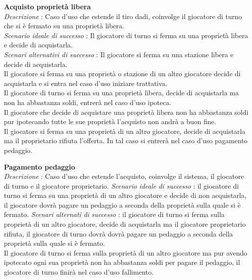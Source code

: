 \documentclass[a4paper]{article}
\begin{document}
\textbf{Acquisto proprietà libera}\\
\textit{Descrizione} : Caso d'uso che estende il tiro dadi, coinvolge il giocatore di turno che si è fermato su una proprietà libera.\\
\textit{Scenario ideale di successo} : Il giocatore di turno si ferma su una proprietà libera e decide di acquistarla.\\
\textit{Scenari alternativi di successo} : Il giocatore si ferma su una stazione libera e decide di acquistarla.\\
Il giocatore si ferma su una proprietà o stazione di un altro giocatore decide di acquistarla e si entra nel caso d'uso iniziare trattativa.\\
Il giocatore di turno si ferma su una proprietà libera, decide di acquistarla ma non ha abbastanza soldi, entrerà nel caso d'uso ipoteca.\\
Il giocatore che decide di acquistare una proprietà libera non ha abbastanza soldi pur ipotecando tutte le sue proprietà l'acquisto non andrà a buon fine.\\
Il giocatore si ferma su una proprietà di un altro giocatore, decide di acquistarla ma il proprietario rifiuta l'offerta.
In tal caso si entrerà nel caso d'uso pagamento pedaggio.

\textbf{Pagamento pedaggio}\\
\textit{Descrizione} : Caso d'uso che estende l'acquisto, coinvolge il sistema, il giocatore di turno e il giocatore proprietario.
\textit{Scenario ideale di successo} : il giocatore di turno si ferma su una proprietà di un altro giocatore e decide di non acquistarla, il giocatore dovrà pagare un pedaggio a seconda della proprietà sulla quale si è fermato.
\textit{Scenari alternati di successo} : il giocatore di turno si ferma sulla proprietà di un altro giocatore, decide di acquistarla ma il giocatore proprietario rifiuta, il giocatore di turno dovrà dovrà pagare un pedaggio a seconda della proprietà sulla quale si è fermato.\\
Il giocatore di turno si ferma sulla proprietà di un altro giocatore ma pur avendo ipotecato ogni sua proprietà non ha abbastanza soldi per pagare il pedaggio, il giocatore di turno finirà nel caso d'uso fallimento.
\end{document}

